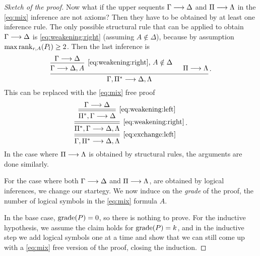 \documentclass[11pt,a4paper]{article}
\begin{document}
\begin{proof}[Sketch of the proof]
    Now what if the upper sequents \(\Gamma\longrightarrow\Delta\) and
    \(\Pi\longrightarrow\Lambda\) in the \eqref{eq:mix} inference are not axioms?
    Then they have to be obtained by at least one inference rule.
    The only possible structural rule that can be applied to obtain
    \(\Gamma\longrightarrow\Delta\) is \eqref{eq:weakening:right}
    (assuming \(A\notin\Delta\)), because by assumption
    \(\operatorname*{max\,rank}_{r,A}(P_l) \geq 2\). Then the last inference is
    \begin{equation*}
        \begin{prooftree}
            \hypo{\Gamma\seq\Delta}
            \infer1[\eqref{eq:weakening:right}, \(A\notin\Delta\)]{\Gamma\seq\Delta,A}
            \hypo{\Pi\seq\Lambda}
            \infer2{\Gamma,\Pi^*\seq\Delta,\Lambda}
        \end{prooftree}\,.
    \end{equation*}
    This can be replaced with the \eqref{eq:mix} free proof
    \begin{equation*}
        \begin{prooftree}
            \hypo{\Gamma\seq\Delta}
            \infer[double]1[\eqref{eq:weakening:left}]{\Pi^*,\Gamma\seq\Delta}
            \infer[double]1[\eqref{eq:weakening:right}]{\Pi^*,\Gamma\seq\Delta,\Lambda}
            \infer[double]1[\eqref{eq:exchange:left}]{\Gamma,\Pi^*\seq\Delta,\Lambda}
        \end{prooftree}\,.
    \end{equation*}
    In the case where \(\Pi\longrightarrow\Lambda\) is obtained by structural rules,
    the arguments are done similarly.

    For the case where both \(\Gamma\longrightarrow\Delta\) and \(\Pi\longrightarrow\Lambda\),
    are obtained by logical inferences, we change our startegy.
    We now induce on the \emph{grade} of the proof, the number
    of logical symbols in the \eqref{eq:mix} formula \(A\).

    In the base case, \(\operatorname{grade}(P) = 0\), so there is nothing to prove.
    For the inductive hypothesis, we assume the claim holds for
    \(\operatorname{grade}(P) = k\), and in the inductive step we add logical symbols
    one at a time and show that we can still come up with a \eqref{eq:mix}
    free version of the proof, closing the induction.


\end{proof}
\end{document}
